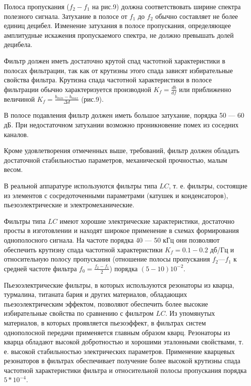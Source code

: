 Полоса пропускания ($f_2 - f_1$ на рис.9) должна соответствовать ширине спектра полезного сигнала. Затухание в полосе от $f_1$ до $f_2$ обычно составляет не более единиц децибел. Изменение затухания в полосе пропускания, определяющее амплитудные искажения пропускаемого спектра, не должно превышать долей децибела.

Фильтр должен иметь достаточно крутой спад частотной характеристики в полосах фильтрации, так как от крутизны этого спада зависят избирательные свойства фильтра. Крутизна спада частотной характеристики в полосе фильтрации обычно характеризуется производной $K_f = \frac{db}{df}$ или приближенно величиной $K_f = \frac{b_{min} - b_{max}}{\Delta d}$ (рис.9).

В полосе подавления фильтр должен иметь большое затухание, порядка 50 — 60 дБ. При недостаточном затухании возможно проникновение помех из соседних каналов. 

Кроме удовлетворения отмеченных выше, требований, фильтр должен обладать достаточной стабильностью параметров, механической прочностью, малым весом.

В реальной аппаратуре используются фильтры типа $LC$, т. е. фильтры, состоящие из элементов с сосредоточенными параметрами (катушек и конденсаторов), пьезоэлектрические и электромеханические.

Фильтры типа $LC$ имеют хорошие электрические характеристики, достаточно просты в изготовлении и находят широкое применение в схемах формирования однополосного сигнала. На частоте порядка 40 — 50 кГц они позволяют обеспечить крутизну спада частотной характеристики $K_f = 0.1 - 0.2$ дб/Гц и относительную полосу пропускания (отношение полосы пропускания $f_2 — f_1$ к средней частоте фильтра $f_0 = \frac{f_2 - f_1}{2}$) порядка $(5 - 10) 10^{-2}$.

Пьезоэлектрические фильтры, в которых используются резонаторы из кварца, турмалина, титаната бария и других материалов, обладающих пьезоэлектрическим эффектом, позволяют обеспечить более высокие избирательные свойства по сравнению с фильтром $LC$. Из упомянутых материалов, в которых проявляется пьезоэффект, в фильтрах систем
однополосной передачи применяется главным образом кварц. Резонаторы из кварца обладают высокой добротностью и хорошими эталонными свойствами, т. е. высокой стабильностью электрических параметров. Применение кварцевых резонаторов в фильтрах обеспечивает получение более высокой крутизны спада частотной характеристики фильтра и относительной полосы пропускания порядка $5 \ast 10^{-4}$.

